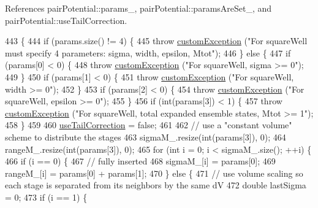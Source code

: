 References pair\-Potential\-::params\-\_\-, pair\-Potential\-::params\-Are\-Set\-\_\-, and pair\-Potential\-::use\-Tail\-Correction.


\begin{DoxyCode}
443                                                                  \{
444     \textcolor{keywordflow}{if} (params.size() != 4) \{
445         \textcolor{keywordflow}{throw} \hyperlink{classcustom_exception}{customException} (\textcolor{stringliteral}{"For squareWell must specify 4 parameters: sigma, width,
       epsilon, Mtot"});
446     \} \textcolor{keywordflow}{else} \{
447         \textcolor{keywordflow}{if} (params[0] < 0) \{
448             \textcolor{keywordflow}{throw} \hyperlink{classcustom_exception}{customException} (\textcolor{stringliteral}{"For squareWell, sigma >= 0"});
449         \}
450         \textcolor{keywordflow}{if} (params[1] < 0) \{
451             \textcolor{keywordflow}{throw} \hyperlink{classcustom_exception}{customException} (\textcolor{stringliteral}{"For squareWell, width >= 0"});
452         \}
453         \textcolor{keywordflow}{if} (params[2] < 0) \{
454             \textcolor{keywordflow}{throw} \hyperlink{classcustom_exception}{customException} (\textcolor{stringliteral}{"For squareWell, epsilon >= 0"});
455         \}
456         \textcolor{keywordflow}{if} (\textcolor{keywordtype}{int}(params[3]) < 1) \{
457             \textcolor{keywordflow}{throw} \hyperlink{classcustom_exception}{customException} (\textcolor{stringliteral}{"For squareWell, total expanded ensemble states, Mtot >=
       1"});
458         \}
459 
460         \hyperlink{classpair_potential_ab4b4538a7e13771f50a29aaac2443037}{useTailCorrection} = \textcolor{keyword}{false};
461 
462         \textcolor{comment}{// use a "constant volume" scheme to distribute the stages}
463         sigmaM\_.resize(\textcolor{keywordtype}{int}(params[3]), 0);
464         rangeM\_.resize(\textcolor{keywordtype}{int}(params[3]), 0);
465         \textcolor{keywordflow}{for} (\textcolor{keywordtype}{int} i = 0; i < sigmaM\_.size(); ++i) \{
466             \textcolor{keywordflow}{if} (i == 0) \{
467                 \textcolor{comment}{// fully inserted}
468                 sigmaM\_[i] = params[0];
469                 rangeM\_[i] = params[0] + params[1];
470             \} \textcolor{keywordflow}{else} \{
471                 \textcolor{comment}{// use volume scaling so each stage is separated from its neighbors by the same dV}
472                 \textcolor{keywordtype}{double} lastSigma = 0;
473                 \textcolor{keywordflow}{if} (i == 1) \{

\end{DoxyCode}
